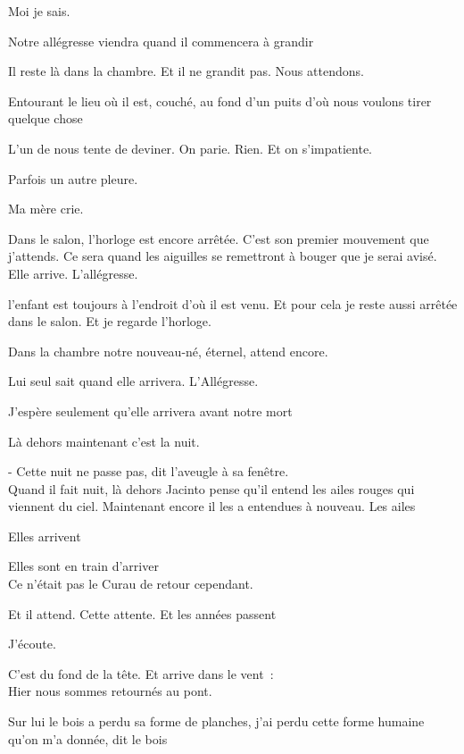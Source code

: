 Moi je sais.

Notre allégresse viendra quand il commencera à grandir

Il reste là dans la chambre. Et il ne grandit pas. Nous attendons.

Entourant le lieu où il est, couché, au fond d'un puits d'où nous
voulons tirer quelque chose

L'un de nous tente de deviner. On parie. Rien. Et on s'impatiente.

Parfois un autre pleure.

Ma mère crie.

Dans le salon, l'horloge est encore arrêtée. C'est son premier mouvement
que j'attends. Ce sera quand les aiguilles se remettront à bouger que je
serai avisé. Elle arrive. L'allégresse.

l'enfant est toujours à l'endroit d'où il est venu. Et pour cela je
reste aussi arrêtée dans le salon. Et je regarde l'horloge.

Dans la chambre notre nouveau-né, éternel, attend encore.

Lui seul sait quand elle arrivera. L'Allégresse.

J'espère seulement qu'elle arrivera avant notre mort

\pagebreak

Là dehors maintenant c'est la nuit.

- Cette nuit ne passe pas, dit l'aveugle à sa fenêtre.\\

Quand il fait nuit, là dehors Jacinto pense qu'il entend les ailes
rouges qui viennent du ciel. Maintenant encore il les a entendues à
nouveau. Les ailes

Elles arrivent

Elles sont en train d'arriver\\

Ce n'était pas le Curau de retour cependant.

Et il attend. Cette attente. Et les années passent

\clearpage
\thispagestyle{empty}
\movetoevenpage

J'écoute.

C'est du fond de la tête. Et arrive dans le vent~:\\

Hier nous sommes retournés au pont.

Sur lui le bois a perdu sa forme de planches, j'ai perdu cette forme
humaine qu'on m'a donnée, dit le bois\\

